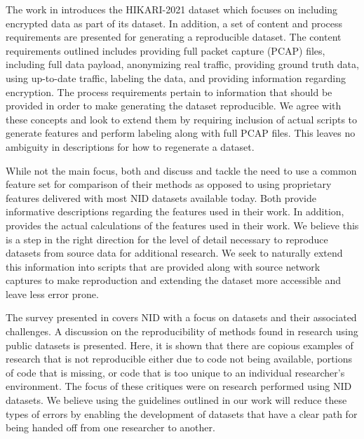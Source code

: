 \documentclass[sigconf]{acmart}
\begin{document}
The work in \cite{ferriyan2021} introduces the HIKARI-2021 dataset which focuses on including encrypted data as part of its dataset.
In addition, a set of content and process requirements are presented for generating a reproducible dataset.
The content requirements outlined includes providing full packet capture (PCAP) files, including full data payload, anonymizing real traffic,  providing ground truth data, using up-to-date traffic, labeling the data, and providing information regarding encryption.
The process requirements pertain to information that should be provided in order to make generating the dataset reproducible.
We agree with these concepts and look to extend them by requiring inclusion of actual scripts to generate features and perform labeling along with full PCAP files.
This leaves no ambiguity in descriptions for how to regenerate a dataset.

While not the main focus, both \cite{e23111532} and \cite{layeghy2021} discuss and tackle the need to use a common feature set for comparison of their methods as opposed to using proprietary features delivered with most NID datasets available today.
Both provide informative descriptions regarding the features used in their work.
In addition, \cite{layeghy2021} provides the actual calculations of the features used in their work.
We believe this is a step in the right direction for the level of detail necessary to reproduce datasets from source data for additional research.
We seek to naturally extend this information into scripts that are provided along with source network captures to make reproduction and extending the dataset more accessible and leave less error prone.

The survey presented in \cite{Chou2022} covers NID with a focus on datasets and their associated challenges.
A discussion on the reproducibility of methods found in research using public datasets is presented.
Here, it is shown that there are copious examples of research that is not reproducible either due to code not being available, portions of code that is missing, or code that is too unique to an individual researcher's environment.
The focus of these critiques were on research performed using NID datasets.
We believe using the guidelines outlined in our work will reduce these types of errors by enabling the development of datasets that have a clear path for being handed off from one researcher to another.
\end{document}

